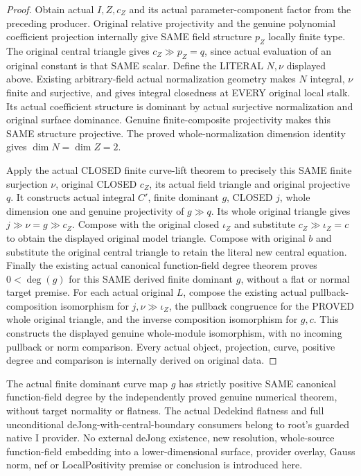 \begin{proof}
Obtain actual $I,Z,c_Z$ and its actual parameter-component factor from
the preceding producer. Original relative projectivity and the genuine
polynomial coefficient projection internally give SAME field structure
$p_Z$ locally finite type. The original central triangle gives
$c_Z\gg p_Z=q$, since actual evaluation of an original constant is
that SAME scalar. Define the LITERAL $N,\nu$ displayed above.
Existing arbitrary-field actual normalization geometry makes $N$
integral, $\nu$ finite and surjective, and gives integral closedness
at EVERY original local stalk. Its actual coefficient structure is
dominant by actual surjective normalization and original surface
dominance. Genuine finite-composite projectivity makes this SAME
structure projective. The proved whole-normalization dimension identity
gives $\dim N=\dim Z=2$.

Apply the actual CLOSED finite curve-lift theorem to precisely this
SAME finite surjection $\nu$, original CLOSED $c_Z$, its actual field
triangle and original projective $q$. It constructs actual integral
$C'$, finite dominant $g$, CLOSED $j$, whole dimension one and genuine
projectivity of $g\gg q$. Its whole original triangle gives
$j\gg\nu=g\gg c_Z$. Compose with the original closed $\iota_Z$
and substitute $c_Z\gg\iota_Z=c$ to obtain the displayed original
model triangle. Compose with original $b$ and substitute the original
central triangle to retain the literal new central equation.
Finally the existing actual canonical function-field degree theorem
proves $0<\deg(g)$ for this SAME derived finite dominant $g$, without
a flat or normal target premise. For each actual original $L$,
compose the existing actual pullback-composition isomorphism for
$j,\nu\gg\iota_Z$, the pullback congruence for the PROVED whole
original triangle, and the inverse composition isomorphism for $g,c$.
This constructs the displayed genuine whole-module isomorphism, with
no incoming pullback or norm comparison. Every actual object, projection, curve,
positive degree and comparison is internally derived on original data.
\end{proof}

The actual finite dominant curve map $g$ has strictly positive SAME
canonical function-field degree by the independently proved genuine
numerical theorem, without target normality or flatness. The actual
Dedekind flatness and full unconditional deJong-with-central-boundary
consumers belong to root's guarded native I provider. No external deJong
existence, new resolution, whole-source function-field embedding into
a lower-dimensional surface, provider overlay, Gauss norm, nef or
LocalPositivity premise or conclusion is introduced here.
